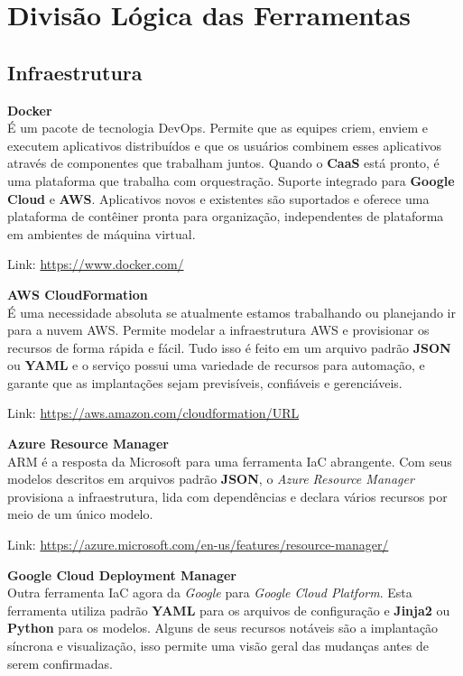 \documentclass[fleqn,10pt]{SelfArx} %
\begin{document}
\section*{Divisão Lógica das Ferramentas}

\subsection*{Infraestrutura}

\textbf{Docker} \\
É um pacote de tecnologia DevOps. Permite que as equipes criem, enviem e executem aplicativos distribuídos e que os usuários combinem esses aplicativos através de componentes que trabalham juntos. Quando o \textbf{CaaS} está pronto, é uma plataforma que trabalha com orquestração. Suporte integrado para \textbf{Google Cloud} e \textbf{AWS}. Aplicativos novos e existentes são suportados e oferece uma plataforma de contêiner pronta para organização, independentes de plataforma em ambientes de máquina virtual.

Link: \url{https://www.docker.com/}

\textbf{AWS CloudFormation} \\
É uma necessidade absoluta se atualmente estamos trabalhando ou planejando ir para a nuvem AWS. Permite modelar a infraestrutura AWS e provisionar os recursos de forma rápida e fácil. Tudo isso é feito em um arquivo padrão \textbf{JSON} ou \textbf{YAML} e o serviço possui uma variedade de recursos para automação, e garante que as implantações sejam previsíveis, confiáveis e gerenciáveis.

Link: \url{https://aws.amazon.com/cloudformation/URL}

\textbf{Azure Resource Manager} \\
ARM é a resposta da Microsoft para uma ferramenta IaC abrangente. Com seus modelos descritos em arquivos padrão \textbf{JSON}, o \textit{Azure Resource Manager} provisiona a infraestrutura, lida com dependências e declara vários recursos por meio de um único modelo.

Link: \url{https://azure.microsoft.com/en-us/features/resource-manager/}

\textbf{Google Cloud Deployment Manager} \\
Outra ferramenta IaC agora da \textit{Google} para \textit{Google Cloud Platform}. Esta ferramenta utiliza padrão \textbf{YAML} para os arquivos de configuração e \textbf{Jinja2} ou \textbf{Python} para os modelos. Alguns de seus recursos notáveis são a implantação síncrona e visualização, isso permite uma visão geral das mudanças antes de serem confirmadas.
\end{document}
